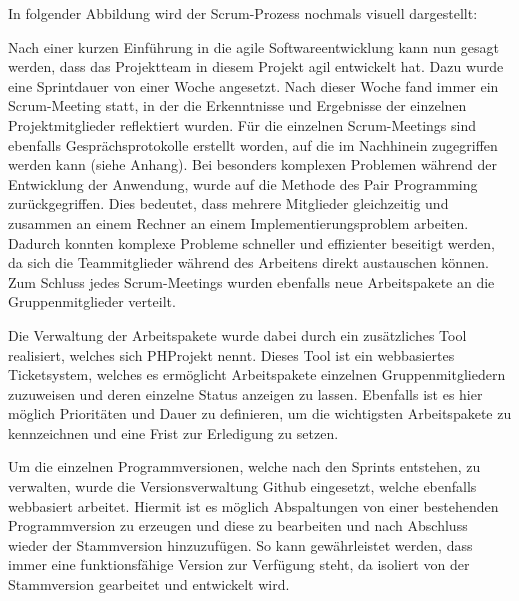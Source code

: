 In folgender Abbildung wird der Scrum-Prozess nochmals visuell dargestellt:

Nach einer kurzen Einführung in die agile Softwareentwicklung kann nun gesagt
werden, dass das Projektteam in diesem Projekt agil entwickelt hat. Dazu wurde
eine Sprintdauer von einer Woche angesetzt. Nach dieser Woche fand immer ein
Scrum-Meeting statt, in der die Erkenntnisse und Ergebnisse der einzelnen
Projektmitglieder reflektiert wurden. Für die einzelnen Scrum-Meetings sind
ebenfalls Gesprächsprotokolle erstellt worden, auf die im Nachhinein
zugegriffen werden kann (siehe Anhang). Bei besonders komplexen Problemen
während der Entwicklung der Anwendung, wurde auf die Methode des Pair
Programming zurückgegriffen. Dies bedeutet, dass mehrere Mitglieder
gleichzeitig und zusammen an einem Rechner an einem Implementierungsproblem
arbeiten. Dadurch konnten komplexe Probleme schneller und effizienter beseitigt
werden, da sich die Teammitglieder während des Arbeitens direkt austauschen
können. Zum Schluss jedes Scrum-Meetings wurden ebenfalls neue Arbeitspakete an
die Gruppenmitglieder verteilt.

Die Verwaltung der Arbeitspakete wurde dabei durch ein zusätzliches Tool
realisiert, welches sich PHProjekt nennt. Dieses Tool ist ein webbasiertes
Ticketsystem, welches es ermöglicht Arbeitspakete einzelnen Gruppenmitgliedern
zuzuweisen und deren einzelne Status anzeigen zu lassen. Ebenfalls ist es hier
möglich Prioritäten und Dauer zu definieren, um die wichtigsten Arbeitspakete
zu kennzeichnen und eine Frist zur Erledigung zu setzen.

Um die einzelnen Programmversionen, welche nach den Sprints entstehen, zu
verwalten, wurde die Versionsverwaltung Github eingesetzt, welche ebenfalls
webbasiert arbeitet. Hiermit ist es möglich Abspaltungen von einer bestehenden
Programmversion zu erzeugen und diese zu bearbeiten und nach Abschluss wieder
der Stammversion hinzuzufügen. So kann gewährleistet werden, dass immer eine
funktionsfähige Version zur Verfügung steht, da isoliert von der Stammversion
gearbeitet und entwickelt wird.